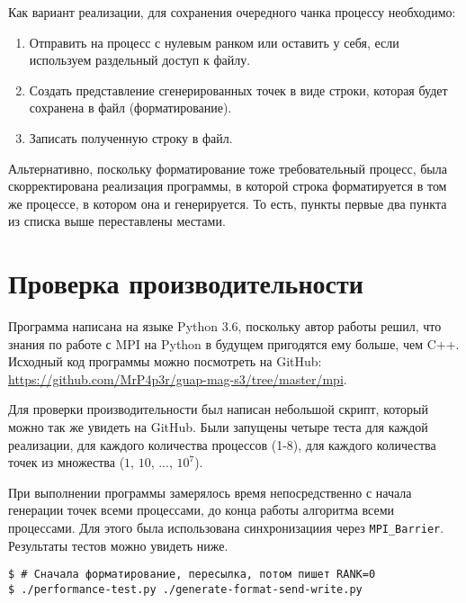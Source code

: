 \documentclass[12pt,a4paper]{article}
\begin{document}
Как вариант реализации, для сохранения очередного чанка процессу необходимо:

\begin{enumerate}
    \item Отправить на процесс с нулевым ранком или оставить у себя, если используем раздельный доступ к файлу.
    \item Создать представление сгенерированных точек в виде строки, которая будет сохранена в файл (форматирование).
    \item Записать полученную строку в файл.
\end{enumerate}

Альтернативно, поскольку форматирование тоже требовательный процесс, была скорректирована реализация
программы, в которой строка форматируется в том же процессе, в котором она и генерируется. То есть,
пункты первые два пункта из списка выше переставлены местами.


\section{Проверка производительности}

Программа написана на языке Python 3.6, поскольку автор работы решил, что
знания по работе с MPI на Python в будущем пригодятся ему больше, чем C++.
Исходный код программы можно посмотреть на GitHub: \\
\url{https://github.com/MrP4p3r/guap-mag-s3/tree/master/mpi}.

Для проверки производительности был написан небольшой скрипт, который
можно так же увидеть на GitHub. Были запущены четыре теста для каждой
реализации, для каждого количества процессов (1-8), для каждого количества
точек из множества ($1$, $10$, ..., $10^7$). 

При выполнении программы замерялось время непосредственно с начала генерации
точек всеми процессами, до конца работы алгоритма всеми процессами. Для
этого была использована синхронизациия через \verb'MPI_Barrier'.
Результаты тестов можно увидеть ниже.

\newpage

\begin{Verbatim}
$ # Сначала форматирование, пересылка, потом пишет RANK=0
$ ./performance-test.py ./generate-format-send-write.py
\end{Verbatim}

\newpage
\end{document}
